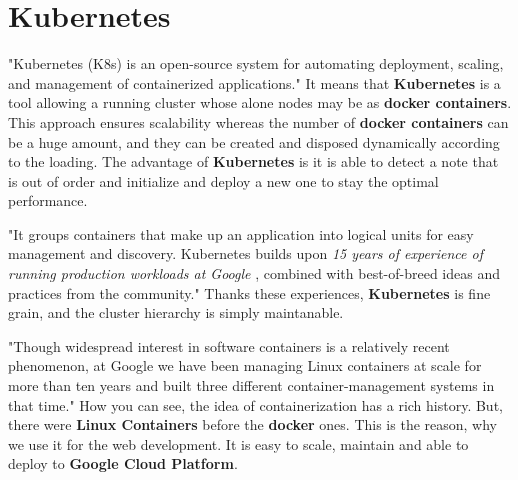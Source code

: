 \section{Kubernetes}\label{sec:kubernetes}
"Kubernetes (K8s) is an open-source system for automating deployment, scaling, and management of containerized applications."\cite{kubernetes}
It means that \textbf{Kubernetes} is a tool allowing a running cluster whose alone nodes may be as \textbf{docker containers}.
This approach ensures scalability whereas the number of \textbf{docker containers} can be a huge amount, and they can be created and disposed dynamically according to the loading.
The advantage of \textbf{Kubernetes} is it is able to detect a note that is out of order and initialize and deploy a new one to stay the optimal performance.

"It groups containers that make up an application into logical units for easy management and discovery.
Kubernetes builds upon \textit{15 years of experience of running production workloads at Google} \cite{kubernetesArticle}, combined with best-of-breed ideas and practices from the community."\cite{kubernetes}
Thanks these experiences, \textbf{Kubernetes} is fine grain, and the cluster hierarchy is simply maintanable.

"Though widespread interest in software containers is a relatively recent phenomenon, at Google we have been managing Linux containers at scale for more than ten years and built three different container-management systems in that time."\cite{kubernetesArticle}
How you can see, the idea of containerization has a rich history.
But, there were \textbf{Linux Containers} before the \textbf{docker} ones.
This is the reason, why we use it for the web development.
It is easy to scale, maintain and able to deploy to \textbf{Google Cloud Platform}.